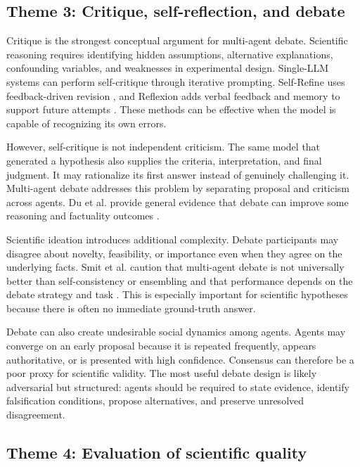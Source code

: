 \documentclass[11pt]{article}
\begin{document}
\subsection{Theme 3: Critique, self-reflection, and debate}
\label{subsec:critique-debate}

Critique is the strongest conceptual argument for multi-agent debate. Scientific reasoning requires
identifying hidden assumptions, alternative explanations, confounding variables, and weaknesses in
experimental design. Single-LLM systems can perform self-critique through iterative prompting.
Self-Refine uses feedback-driven revision \cite{madaan2023selfrefine}, and Reflexion adds verbal
feedback and memory to support future attempts \cite{shinn2023reflexion}. These methods can be
effective when the model is capable of recognizing its own errors.

However, self-critique is not independent criticism. The same model that generated a hypothesis
also supplies the criteria, interpretation, and final judgment. It may rationalize its first answer
instead of genuinely challenging it. Multi-agent debate addresses this problem by separating
proposal and criticism across agents. Du et al. provide general evidence that debate can improve
some reasoning and factuality outcomes \cite{du2024improving}.

Scientific ideation introduces additional complexity. Debate participants may disagree about
novelty, feasibility, or importance even when they agree on the underlying facts. Smit et al. caution
that multi-agent debate is not universally better than self-consistency or ensembling and that
performance depends on the debate strategy and task \cite{smit2024mad}. This is especially
important for scientific hypotheses because there is often no immediate ground-truth answer.

Debate can also create undesirable social dynamics among agents. Agents may converge on an early
proposal because it is repeated frequently, appears authoritative, or is presented with high
confidence. Consensus can therefore be a poor proxy for scientific validity. The most useful debate
design is likely adversarial but structured: agents should be required to state evidence, identify
falsification conditions, propose alternatives, and preserve unresolved disagreement.

\subsection{Theme 4: Evaluation of scientific quality}
\label{subsec:evaluation-quality}
\end{document}
